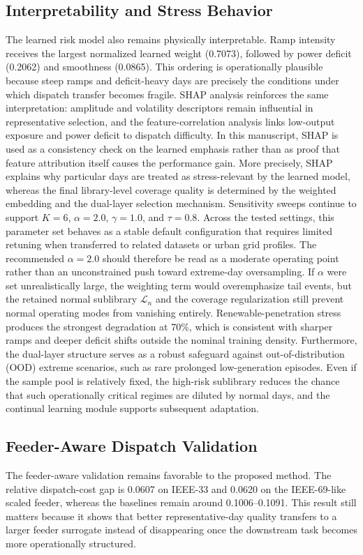\documentclass[journal]{IEEEtran}
\begin{document}
\subsection{Interpretability and Stress Behavior}
The learned risk model also remains physically interpretable. Ramp intensity receives the largest normalized learned weight (0.7073), followed by power deficit (0.2062) and smoothness (0.0865). This ordering is operationally plausible because steep ramps and deficit-heavy days are precisely the conditions under which dispatch transfer becomes fragile. SHAP analysis reinforces the same interpretation: amplitude and volatility descriptors remain influential in representative selection, and the feature-correlation analysis links low-output exposure and power deficit to dispatch difficulty. In this manuscript, SHAP is used as a consistency check on the learned emphasis rather than as proof that feature attribution itself causes the performance gain. More precisely, SHAP explains why particular days are treated as stress-relevant by the learned model, whereas the final library-level coverage quality is determined by the weighted embedding and the dual-layer selection mechanism. Sensitivity sweeps continue to support $K=6$, $\alpha=2.0$, $\gamma=1.0$, and $\tau=0.8$. Across the tested settings, this parameter set behaves as a stable default configuration that requires limited retuning when transferred to related datasets or urban grid profiles. The recommended $\alpha=2.0$ should therefore be read as a moderate operating point rather than an unconstrained push toward extreme-day oversampling. If $\alpha$ were set unrealistically large, the weighting term would overemphasize tail events, but the retained normal sublibrary $\mathcal{L}_n$ and the coverage regularization still prevent normal operating modes from vanishing entirely. Renewable-penetration stress produces the strongest degradation at 70\%, which is consistent with sharper ramps and deeper deficit shifts outside the nominal training density. Furthermore, the dual-layer structure serves as a robust safeguard against out-of-distribution (OOD) extreme scenarios, such as rare prolonged low-generation episodes. Even if the sample pool is relatively fixed, the high-risk sublibrary reduces the chance that such operationally critical regimes are diluted by normal days, and the continual learning module supports subsequent adaptation.

\subsection{Feeder-Aware Dispatch Validation}
The feeder-aware validation remains favorable to the proposed method. The relative dispatch-cost gap is 0.0607 on IEEE-33 and 0.0620 on the IEEE-69-like scaled feeder, whereas the baselines remain around 0.1006--0.1091. This result still matters because it shows that better representative-day quality transfers to a larger feeder surrogate instead of disappearing once the downstream task becomes more operationally structured.
\end{document}
